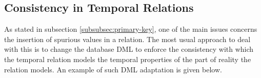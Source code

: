 \subsection{\label{subsubsec:consistency}Consistency in Temporal Relations}
As stated in subsection \ref{subsubsec:primary-key}, one of the main issues concerns the insertion of spurious values in a relation. The most usual approach to deal with this is to change the database DML to enforce the consistency with which the temporal relation models the temporal properties of the part of reality the relation models. An example of such DML adaptation is given below.


